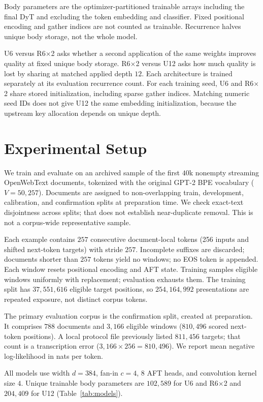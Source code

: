 \documentclass{article}
\begin{document}
Body parameters are the optimizer-partitioned trainable arrays including the final DyT and excluding the token embedding and classifier. Fixed positional encoding and gather indices are not counted as trainable. Recurrence halves unique body storage, not the whole model.

U6 versus R6$\times$2 asks whether a second application of the same weights improves quality at fixed unique body storage. R6$\times$2 versus U12 asks how much quality is lost by sharing at matched applied depth $12$. Each architecture is trained separately at its evaluation recurrence count. For each training seed, U6 and R6$\times$2 share stored initialization, including sparse gather indices. Matching numeric seed IDs does not give U12 the same embedding initialization, because the upstream key allocation depends on unique depth.

\section{Experimental Setup}

We train and evaluate on an archived sample of the first $40$k nonempty streaming OpenWebText documents, tokenized with the original GPT-2 BPE vocabulary ($V = 50{,}257$). Documents are assigned to non-overlapping train, development, calibration, and confirmation splits at preparation time. We check exact-text disjointness across splits; that does not establish near-duplicate removal. This is not a corpus-wide representative sample.

Each example contains $257$ consecutive document-local tokens (256 inputs and shifted next-token targets) with stride $257$. Incomplete suffixes are discarded; documents shorter than $257$ tokens yield no windows; no EOS token is appended. Each window resets positional encoding and AFT state. Training samples eligible windows uniformly with replacement; evaluation exhausts them. The training split has $37{,}551{,}616$ eligible target positions, so $254{,}164{,}992$ presentations are repeated exposure, not distinct corpus tokens.

The primary evaluation corpus is the confirmation split, created at preparation. It comprises $788$ documents and $3{,}166$ eligible windows ($810{,}496$ scored next-token positions). A local protocol file previously listed $811{,}456$ targets; that count is a transcription error ($3{,}166\times 256=810{,}496$). We report mean negative log-likelihood in nats per token.

All models use width $d=384$, fan-in $c=4$, $8$ AFT heads, and convolution kernel size $4$. Unique trainable body parameters are $102{,}589$ for U6 and R6$\times$2 and $204{,}409$ for U12 (Table~\ref{tab:models}).
\end{document}
